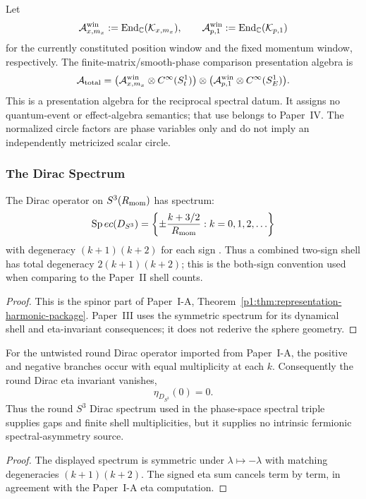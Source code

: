 \documentclass[12pt,a4paper]{article}
\begin{document}
\begin{definition}
\label{p3:def:phase-space-algebra}
Let
\[
 \mathcal A_{x,m_x}^{\rm win}:=\operatorname{End}_{\mathbb{C}}(\mathcal K_{x,m_x}),
 \qquad
 \mathcal A_{p,1}^{\rm win}:=\operatorname{End}_{\mathbb{C}}(\mathcal K_{p,1})
\]
for the currently constituted position window and the fixed momentum window,
respectively.  The finite-matrix/smooth-phase comparison presentation algebra is
\[
 \mathcal A_{\rm total}
 =\bigl(\mathcal A_{x,m_x}^{\rm win}\otimes C^\infty(S^1_t)\bigr)
  \otimes
  \bigl(\mathcal A_{p,1}^{\rm win}\otimes C^\infty(S^1_E)\bigr).
\]
This is a presentation algebra for the reciprocal spectral datum.  It assigns
no quantum-event or effect-algebra semantics; that use belongs to Paper~IV.
The normalized circle factors are phase variables only and do not imply an
independently metricized scalar circle.
\end{definition}

\subsubsection{The Dirac Spectrum}

\begin{proposition}
\label{paper3b:proposition:atlas-dirac-spectrum-on-s-3-b5091ee}

The Dirac operator on $S^3(R_{\mathrm{mom}})$ has spectrum:
\begin{equation}
\operatorname{Sp}ec(D_{S^3}) = \left\{ \pm\frac{k + 3/2}{R_{\mathrm{mom}}} : k = 0, 1, 2, \ldots \right\}
\end{equation}
with degeneracy $(k+1)(k+2)$ for each sign
\cite{CamporesiHiguchi1996}.  Thus a combined two-sign shell has total
degeneracy $2(k+1)(k+2)$; this is the both-sign convention used when comparing
to the Paper~II shell counts.
\end{proposition}
\begin{proof}
This is the spinor part of Paper~I-A,
Theorem~\ref{p1:thm:representation-harmonic-package}.  Paper~III uses the
symmetric spectrum for its dynamical shell and eta-invariant consequences; it
does not rederive the sphere geometry.
\end{proof}

\begin{corollary}
\label{p3:cor:round-dirac-eta-zero}
For the untwisted round Dirac operator imported from Paper~I-A, the positive and
negative branches occur with equal multiplicity at each \(k\).  Consequently the
round Dirac eta invariant vanishes,
\[
\eta_{D_{S^3}}(0)=0.
\]
Thus the round \(S^3\) Dirac spectrum used in the phase-space spectral triple
supplies gaps and finite shell multiplicities, but it supplies no intrinsic
fermionic spectral-asymmetry source.
\end{corollary}
\begin{proof}
The displayed spectrum is symmetric under \(\lambda\mapsto-\lambda\) with matching
degeneracies \((k+1)(k+2)\).  The signed eta sum cancels term by term, in agreement
with the Paper~I-A eta computation.
\end{proof}
\end{document}
